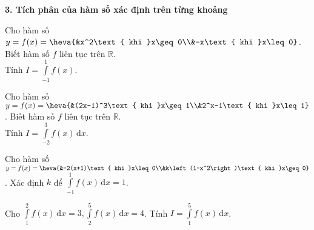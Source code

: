 \textbf{3. Tích phân của hàm số xác định trên từng khoảng}
\begin{ex}%
	Cho hàm số $y=f(x)=\heva{&x^2\text{ khi }x\geq 0\\&-x\text{ khi }x\leq 0}$. Biết hàm số $f$ liên tục trên $\mathbb{R}$.\\
	Tính $I=\displaystyle\int\limits_{-1}^1 f(x)$.
\end{ex}
\begin{ex}%
	Cho hàm số $y=f(x)=\heva{&(2x-1)^3\text{ khi }x\geq 1\\&2^x-1\text{ khi }x\leq 1}$. Biết hàm số $f$ liên tục trên $\mathbb{R}$.\\
	Tính $I=\displaystyle\int\limits_{-2}^3 f(x)\mathrm{\,d}x$.
\end{ex}
\begin{ex}%
	Cho hàm số $y=f(x)=\heva{&-2(x+1)\text{ khi }x\leq 0\\&k\left(1-x^2\right)\text{ khi }x\geq 0}$. Xác định $k$ để $\displaystyle\int\limits_{-1}^1 f(x)\mathrm{\,d}x=1$.
\end{ex}
\begin{ex}%
	Cho $\displaystyle\int\limits_1^2 f(x)\mathrm{\,d}x=3,\displaystyle\int\limits_2^5 f(x)\mathrm{\,d}x=4$. Tính $I=\displaystyle\int\limits_1^5 f(x)\mathrm{\,d}x$.
\end{ex}
